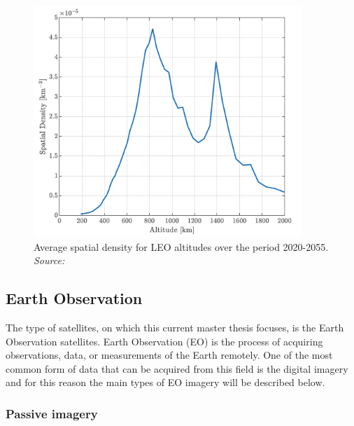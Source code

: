 \begin{figure}[!htb]
\includegraphics[width=0.9\textwidth]{Images/crisp2.png}\caption{Average spatial density for LEO altitudes over the period 2020-2055. \textit{Source: \cite{Crisp 2020}}}
\label{crisp2} 
\end{figure}

\bigskip
\subsection{Earth Observation}
\label{EO}
\bigskip

The type of satellites, on which this current master thesis focuses, is the Earth Observation satellites. Earth Observation (EO) is the process of acquiring observations, data, or measurements of the Earth remotely. One of the most common form of data that can be acquired from this field is the digital imagery and for this reason the main types of EO imagery will be described below. \cite{ESA EO}

\bigskip
\subsubsection{Passive imagery}
\bigskip

